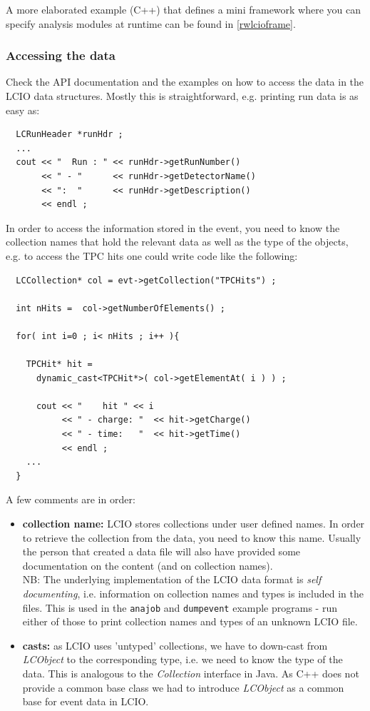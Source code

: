 \documentclass[twoside]{article}
\begin{document}
A more elaborated example (C++) that defines a mini framework where you can specify analysis modules at 
runtime can be found in \ref{rwlcioframe}.

\subsubsection{Accessing the data}
Check the API documentation and the examples on how to access the data in the LCIO data structures.
Mostly this is straightforward, e.g. printing run data is as easy as:

\begin{verbatim}
  LCRunHeader *runHdr ;
  ...  
  cout << "  Run : " << runHdr->getRunNumber() 
       << " - "      << runHdr->getDetectorName() 
       << ":  "      << runHdr->getDescription()  
       << endl ;
\end{verbatim}

In order to access the information stored in the event, you need to know the collection names that 
hold the relevant data as well as the type of the objects, e.g. to access the TPC hits one could 
write code like the following:

\begin{verbatim}
  LCCollection* col = evt->getCollection("TPCHits") ;

  int nHits =  col->getNumberOfElements() ;

  for( int i=0 ; i< nHits ; i++ ){

    TPCHit* hit = 
      dynamic_cast<TPCHit*>( col->getElementAt( i ) ) ;

      cout << "    hit " << i 
           << " - charge: "  << hit->getCharge() 
           << " - time:   "  << hit->getTime()
           << endl ; 
    ...
  }
\end{verbatim}

A few comments are in order:
\begin{itemize}
\item{ {\bf collection name:} LCIO stores collections under user defined names. In order to retrieve 
the collection from the data, you need to know this name. Usually the person that created a data 
file will also have provided some documentation on the content (and on collection names). \\
NB: The underlying implementation of the LCIO data format is {\em self documenting}, i.e. information
on collection names and types is included in the files. This is used in the \verb$anajob$ and 
\verb$dumpevent$ example programs - run either of those to print collection names and 
types of an unknown LCIO file.
}

\item{ {\bf casts:} as LCIO uses 'untyped' collections, we have to down-cast from {\em LCObject} to 
the corresponding type, i.e. we need to know the type of the data. This is analogous to the 
{\em Collection} interface in Java. As C++ does not provide a common base class we had to 
introduce {\em LCObject} as a common base for event data in LCIO.
}

\end {itemize}
\end{document}

